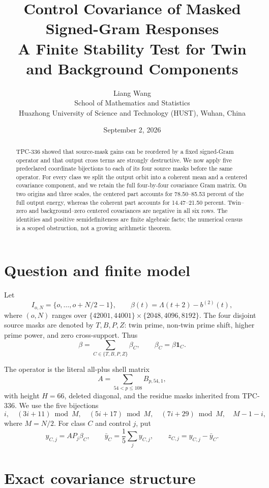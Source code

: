 \documentclass[10pt]{article}
\title{Control Covariance of Masked Signed-Gram Responses\\
\large A Finite Stability Test for Twin and Background Components}
\author{Liang Wang\\School of Mathematics and Statistics\\
Huazhong University of Science and Technology (HUST), Wuhan, China}
\date{September 2, 2026}
\newcommand{\ind}{\mathbf 1}
\begin{document}
\maketitle

\begin{abstract}
TPC-336 showed that source-mask gains can be reordered by a fixed signed-Gram
operator and that output cross terms are strongly destructive.  We now apply
five predeclared coordinate bijections to each of its four source masks before
the same operator.  For every class we split the output orbit into a coherent
mean and a centered covariance component, and we retain the full four-by-four
covariance Gram matrix.  On two origins and three scales, the centered part
accounts for 78.50--85.53 percent of the full output energy, whereas the
coherent part accounts for 14.47--21.50 percent.  Twin--zero and
background--zero centered covariances are negative in all six rows.  The
identities and positive semidefiniteness are finite algebraic facts; the
numerical census is a scoped obstruction, not a growing arithmetic theorem.
\end{abstract}

\section{Question and finite model}

Let
\[
 I_{o,N}=\{o,\ldots,o+N/2-1\},\qquad
 \beta(t)=\Lambda(t+2)-b^{(2)}(t),
\]
where $(o,N)$ ranges over $\{42001,44001\}\times\{2048,4096,8192\}$.
The four disjoint source masks are denoted by $T,B,P,Z$: twin prime,
non-twin prime shift, higher prime power, and zero cross-support.  Thus
\[
 \beta=\sum_{C\in\{T,B,P,Z\}}\beta_C,
 \qquad \beta_C=\beta\ind_C.
\]

The operator is the literal all-plus shell matrix
\[
 A=\sum_{54<p\leq108}B_{p,54,1},
\]
with height $H=66$, deleted diagonal, and the residue masks inherited from
TPC-336.  We use the five bijections
\[
 i,\quad (3i+11)\bmod M,\quad (5i+17)\bmod M,\quad
 (7i+29)\bmod M,\quad M-1-i,
\]
where $M=N/2$.  For class $C$ and control $j$, put
\[
 y_{C,j}=A P_j\beta_C,\qquad
 \bar y_C=\frac15\sum_jy_{C,j},\qquad z_{C,j}=y_{C,j}-\bar y_C.
\]

\section{Exact covariance structure}
\end{document}
